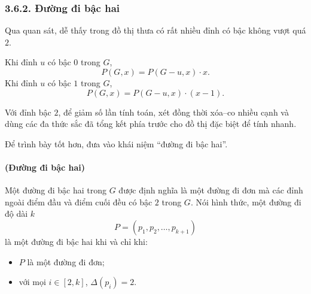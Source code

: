 \documentclass[11pt]{article}
\begin{document}
\begin{center}
\end{center}

\subsubsection*{3.6.2. Đường đi bậc hai}

Qua quan sát, dễ thấy trong đồ thị thưa có rất nhiều đỉnh có bậc không vượt
quá \(2\).

Khi đỉnh \(u\) có bậc \(0\) trong \(G\),
\[
  P(G,x)=P(G-u,x)\cdot x.
\]
Khi đỉnh \(u\) có bậc \(1\) trong \(G\),
\[
  P(G,x)=P(G-u,x)\cdot (x-1).
\]

Với đỉnh bậc \(2\), để giảm số lần tính toán, xét đồng thời xóa--co nhiều
cạnh và dùng các đa thức sắc đã tổng kết phía trước cho đồ thị đặc biệt để
tính nhanh.

Để trình bày tốt hơn, đưa vào khái niệm ``đường đi bậc hai''.

\paragraph{ (Đường đi bậc hai)}
Một đường đi bậc hai trong \(G\) được định nghĩa là một đường đi đơn mà các
đỉnh ngoài điểm đầu và điểm cuối đều có bậc \(2\) trong \(G\). Nói hình thức,
một đường đi độ dài \(k\)
\[
  P=(p_1,p_2,\ldots,p_{k+1})
\]
là một đường đi bậc hai khi và chỉ khi:
\begin{itemize}
  \item \(P\) là một đường đi đơn;
  \item với mọi \(i\in[2,k]\), \(\Delta(p_i)=2\).
\end{itemize}
\end{document}
